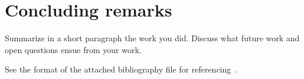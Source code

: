 \documentclass[11pt]{article}
\begin{document}
\section{Concluding remarks}
\label{sec:conclusion}
Summarize in a short paragraph the work you did. Discuss what future work and open questions ensue from your work.



See the format of the attached bibliography file for referencing~\cite{ref1}.
\end{document}
